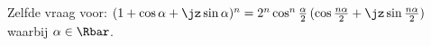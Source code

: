 Zelfde vraag voor: \((1+\cos \alpha + \jz \sin \alpha )^n = 2^n \cos ^n \frac {\alpha }{2} \,(\cos \frac {n\alpha }{2} + \jz \sin \frac {n\alpha }{2})\) waarbij \(\alpha \in \Rbar \).

